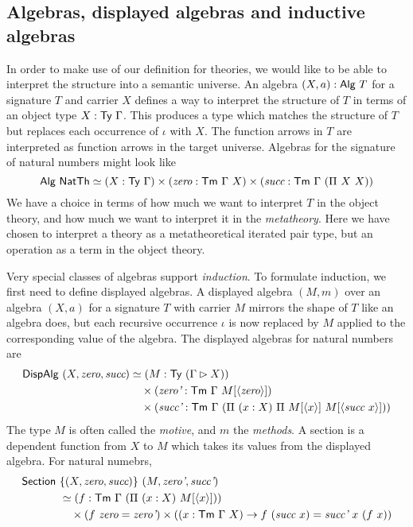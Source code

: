 \subsection{Algebras, displayed algebras and inductive algebras} \label{sub:algebras}

In order to make use of our definition for theories, we would like to be able to interpret
the structure into a semantic universe. An algebra $(X, a) : \textsf{Alg}\ T$
for a signature $T$ and carrier $X$ defines a way to interpret the structure of $T$
in terms of an object type $X : \mta{Ty}\ \Gamma$. This produces a type which
matches the structure of $T$ but replaces each occurrence of $\iota$ with $X$.
The function arrows in $T$ are interpreted as function arrows in the target universe.
Algebras for the signature of natural numbers might look like
\[
	\mta{Alg}\ \mta{NatTh}\simeq (X : \Ty\ \Gamma) \times (\textit{zero} : \Tm\ \Gamma\ X) \times (\textit{succ} : \Tm\ \Gamma\ (\Pi\ X\ X))
\]
We have a choice in terms of how much we want to interpret $T$ in the object theory,
and how much we want to interpret it in the \emph{metatheory}. Here we have chosen to interpret
a theory as a metatheoretical iterated pair type, but an operation as a term in the object theory.

Very special classes of algebras support \emph{induction}.
To formulate induction, we first need to define displayed algebras.
A displayed algebra $(M, m)$ over an algebra $(X, a)$ for a signature $T$ with
carrier $M$ mirrors the shape of $T$ like an algebra does, but each recursive
occurrence $\iota$ is now replaced by $M$ applied to the corresponding value of
the algebra. The displayed algebras for natural numbers are
\begin{align*}
	\mta{DispAlg}\ (X, \textit{zero}, \textit{succ}) & \simeq (M : \Ty\ (\Gamma \rhd X))                                                      \\
	                               & \quad \times (\textit{zero'} : \Tm\ \Gamma\ M[\Msub{\textit{zero}}])                                            \\
	                               & \quad \times (\textit{succ'} : \Tm\ \Gamma\ (\Pi\ (x : X)\ \Pi\ M[\Msub{x}]\ M[\Msub{\textit{succ}\ x}]))
\end{align*}
The type $M$ is often called the \emph{motive}, and $m$ the \emph{methods}.
A section is a dependent function from $X$ to $M$ which takes its values from
the displayed algebra. For natural numebrs,
\begin{align*}
	\mta{Section}\  & \{(X, \textit{zero}, \textit{succ})\}\ (M, \textit{zero'}, \textit{succ'})                                                                                           \\
	                & \simeq (f : \Tm\ \Gamma\ (\Pi\ (x : X)\ M[\Msub x]))                                                                                   \\
	                & \quad \times (f\ \textit{zero} = \textit{zero'}) \times ((x : \Tm\ \Gamma\ X) \to f\ (\textit{succ}\ x) = \textit{succ'}\ x\ (f\ x))
\end{align*}


